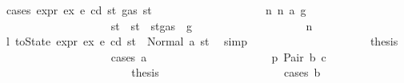\begin{isabellebody}
\ {\isacharparenleft}{\kern0pt}cases\ {\isachardoublequoteopen}expr\ ex\ e\ cd\ st{\isacharprime}{\kern0pt}{\isacharprime}{\kern0pt}\ {\isacharparenleft}{\kern0pt}gas\ st{\isacharprime}{\kern0pt}{\isacharprime}{\kern0pt}{\isacharparenright}{\kern0pt}{\isachardoublequoteclose}{\isacharparenright}{\kern0pt}\isanewline
\ \ \ \ \ \ \ \ \ \ \ \ \ \ \ \ \ \ \isamarkupfalse%
\ n{}{\isacharcolon}{\kern0pt}\ {\isacharparenleft}{\kern0pt}n\ a{}\ g{\isacharprime}{\kern0pt}{\isacharprime}{\kern0pt}{\isacharparenright}{\kern0pt}\isanewline
\ \ \ \ \ \ \ \ \ \ \ \ \ \ \ \ \ \ \isamarkupfalse%
\ st{\isacharprime}{\kern0pt}{\isacharprime}{\kern0pt}{\isacharprime}{\kern0pt}\ \ {\isachardoublequoteopen}st{\isacharprime}{\kern0pt}{\isacharprime}{\kern0pt}{\isacharprime}{\kern0pt}\ {\isacharequal}{\kern0pt}\ st{\isacharprime}{\kern0pt}{\isacharprime}{\kern0pt}{\isasymlparr}gas\ {\isacharcolon}{\kern0pt}{\isacharequal}{\kern0pt}\ g{\isacharprime}{\kern0pt}{\isacharprime}{\kern0pt}{\isasymrparr}{\isachardoublequoteclose}\isanewline
\ \ \ \ \ \ \ \ \ \ \ \ \ \ \ \ \ \ \isamarkupfalse%
\ n{}\ \isamarkupfalse%
\ l{}{\isacharcolon}{\kern0pt}\ {\isachardoublequoteopen}toState\ {\isacharparenleft}{\kern0pt}expr\ ex\ e\ cd{\isacharparenright}{\kern0pt}\ st{\isacharprime}{\kern0pt}{\isacharprime}{\kern0pt}\ {\isacharequal}{\kern0pt}\ Normal\ {\isacharparenleft}{\kern0pt}a{}{\isacharcomma}{\kern0pt}\ st{\isacharprime}{\kern0pt}{\isacharprime}{\kern0pt}{\isacharprime}{\kern0pt}{\isacharparenright}{\kern0pt}{\isachardoublequoteclose}\ \isamarkupfalse%
\ simp\isanewline
\ \ \ \ \ \ \ \ \ \ \ \ \ \ \ \ \ \ \isamarkupfalse%
\ \isamarkupfalse%
\ {\isacharquery}{\kern0pt}thesis\isanewline
\ \ \ \ \ \ \ \ \ \ \ \ \ \ \ \ \ \ \isamarkupfalse%
\ {\isacharparenleft}{\kern0pt}cases\ a{}{\isacharparenright}{\kern0pt}\isanewline
\ \ \ \ \ \ \ \ \ \ \ \ \ \ \ \ \ \ \ \ \isamarkupfalse%
\ p{}{\isacharcolon}{\kern0pt}\ {\isacharparenleft}{\kern0pt}Pair\ b\ c{\isacharparenright}{\kern0pt}\isanewline
\ \ \ \ \ \ \ \ \ \ \ \ \ \ \ \ \ \ \ \ \isamarkupfalse%
\ \isamarkupfalse%
\ {\isacharquery}{\kern0pt}thesis\isanewline
\ \ \ \ \ \ \ \ \ \ \ \ \ \ \ \ \ \ \ \ \isamarkupfalse%
\ {\isacharparenleft}{\kern0pt}cases\ b{\isacharparenright}{\kern0pt}\isanewline
\ \ \ \ \ \ \ \ \ \ \ \ \ \ \ \ \ \ \ \ \ \ \isamarkupfalse%

\end{isabellebody}
